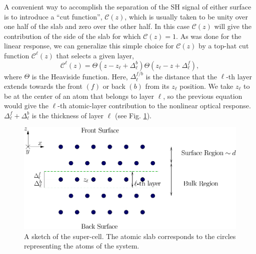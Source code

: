 A convenient way to accomplish the separation of the SH signal of either surface
is to introduce a ``cut function'', ${\boldsymbol{\mathcal{C}}}(z)$, which is
usually taken to be unity over one half of the slab and zero over the other
half.\cite{reiningPRB94} In this case ${\boldsymbol{\mathcal{C}}}(z)$ will give
the contribution of the side of the slab for which
${\boldsymbol{\mathcal{C}}}(z)=1$. As was done for the linear
response,\cite{mendozaPRB06} we can generalize this simple choice for
${\boldsymbol{\mathcal{C}}}(z)$ by a top-hat cut function
${\boldsymbol{\mathcal{C}}}^\ell(z)$ that selects a given layer,
\begin{equation}
{\boldsymbol{\mathcal{C}}}^\ell(z)=\Theta(z-z_\ell+\Delta_\ell^{b})  
            \Theta(z_\ell-z+\Delta_\ell^f),
\label{sz}
\end{equation} 
where $\Theta$ is the Heaviside function. Here, $\Delta_\ell^{f/b}$ is the
distance that the $\ell$-th layer extends towards the front $(f)$ or back $(b)$
from its $z_\ell$ position. We take $z_\ell$ to be at the center of an atom that
belongs to layer $\ell$, so the previous equation would give the $\ell$-th
atomic-layer contribution to the nonlinear optical response.
$\Delta_\ell^f+\Delta_\ell^b$ is the thickness of layer $\ell$ (see
Fig. \ref{fslab}).
\begin{figure}
\centering
\includegraphics[scale=.7]{content/figures/diag-slab}
\caption{A sketch of the super-cell. The atomic slab corresponds to the circles
representing the atoms of the system.
\label{fslab}} 
\end{figure}

